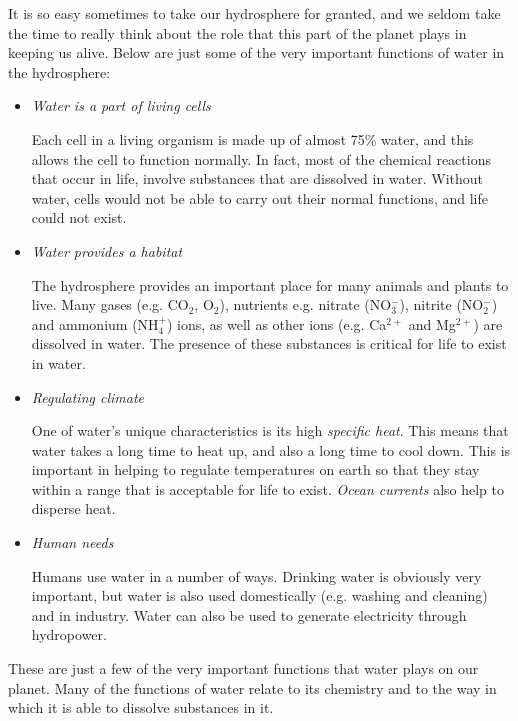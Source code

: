 It is so easy sometimes to take our hydrosphere for granted, and we seldom take the time to really think about the role that this part of the planet plays in keeping us alive. Below are just some of the very important functions of water in the hydrosphere:

\begin{itemize}
\item{\textit{Water is a part of living cells}

Each cell in a living organism is made up of almost 75\% water, and this allows the cell to function normally. In fact, most of the chemical reactions that occur in life, involve substances that are dissolved in water. Without water, cells would not be able to carry out their normal functions, and life could not exist.}

\item{\textit{Water provides a habitat}

The hydrosphere provides an important place for many animals and plants to live. Many gases (e.g. CO$_{2}$, O$_{2}$), nutrients e.g. nitrate (NO$_{3}^{-}$), nitrite (NO$_{2}^{-}$) and ammonium (NH$_{4}^{+}$) ions, as well as other ions (e.g. Ca$^{2+}$ and Mg$^{2+}$) are dissolved in water. The presence of these substances is critical for life to exist in water.}
\item{\textit{Regulating climate} 

One of water's unique characteristics is its high \textit{specific heat}. This means that water takes a long time to heat up, and also a long time to cool down. This is important in helping to regulate temperatures on earth so that they stay within a range that is acceptable for life to exist. \textit{Ocean currents} also help to disperse heat. }
\item{\textit{Human needs}

Humans use water in a number of ways. Drinking water is obviously very important, but water is also used domestically (e.g. washing and cleaning) and in industry. Water can also be used to generate electricity through hydropower.}
\end{itemize}

These are just a few of the very important functions that water plays on our planet. Many of the functions of water relate to its chemistry and to the way in which it is able to dissolve substances in it.






